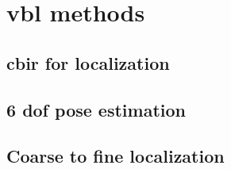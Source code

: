 \section{\acs*{vbl} methods}
\label{sec:vbl_methods}


	
\subsection{\acs*{cbir} for localization}


\subsection{6 \acs*{dof} pose estimation}


\subsection{Coarse to fine localization}